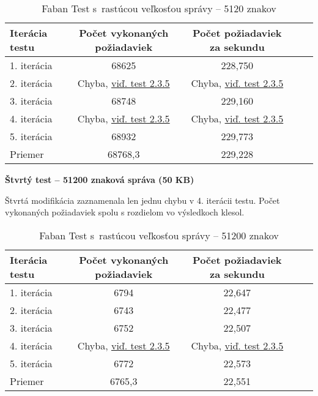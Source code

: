 \documentclass[12pt,oneside,final]{fithesis-utf8}
\begin{document}
\begin{itemize}
\begin{table}[H]
\begin{center}
\begin{tabular}{ | l | c | c | c | c |}
		\hline
		 \textbf{Iterácia testu} & \textbf{Počet vykonaných požiadaviek} & \textbf{Počet požiadaviek za sekundu} \\ \hline
		 1. iterácia & 68625 & 228,750 \\ \hline
		 2. iterácia & Chyba, \hyperlink{label}{viď. test 2.3.5} & Chyba, \hyperlink{label}{viď. test 2.3.5} \\ \hline
		 3. iterácia & 68748 & 229,160 \\ \hline
		 4. iterácia & Chyba, \hyperlink{label}{viď. test 2.3.5} & Chyba, \hyperlink{label}{viď. test 2.3.5} \\ \hline
		 5. iterácia & 68932 & 229,773 \\ \hline
		 Priemer & 68768,3 & 229,228 \\ \hline
		 
\end{tabular}
\end{center}
\caption{Faban Test s~rastúcou veľkosťou správy -- 5120 znakov}
\end{table}


\textbf{Štvrtý test -- 51200 znaková správa (50 KB)}

Štvrtá modifikácia zaznamenala len jednu chybu v 4. iterácii testu. Počet vykonaných požiadaviek spolu s rozdielom vo výsledkoch klesol.

\begin{table}[H]
\begin{center}
\begin{tabular}{ | l | c | c | c | c |}
		\hline
		 \textbf{Iterácia testu} & \textbf{Počet vykonaných požiadaviek} & \textbf{Počet požiadaviek za sekundu} \\ \hline
		 1. iterácia & 6794 & 22,647 \\ \hline
		 2. iterácia & 6743 & 22,477 \\ \hline
		 3. iterácia & 6752 & 22,507 \\ \hline
		 4. iterácia & Chyba, \hyperlink{label}{viď. test 2.3.5} & Chyba, \hyperlink{label}{viď. test 2.3.5} \\ \hline
		 5. iterácia & 6772 & 22,573 \\ \hline
		 Priemer & 6765,3 & 22,551 \\ \hline
		 
\end{tabular}
\end{center}
\caption{Faban Test s~rastúcou veľkosťou správy -- 51200 znakov}
\end{table}



\end{itemize}
\end{document}
